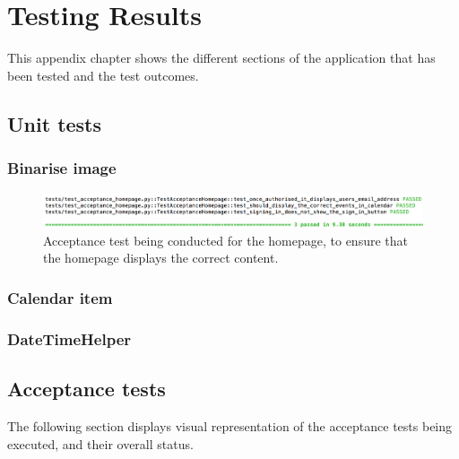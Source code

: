 \chapter{Testing Results}
\label{appendix:test_results}
This appendix chapter shows the different sections of the application that has been tested and the test outcomes.




\section{Unit tests}
\subsection{Binarise image}
\begin{figure}[H]
  \centering
  \includegraphics[width=\textwidth]{images/test_acceptance_homepage}
  \caption{Acceptance test being conducted for the homepage, to ensure that the homepage displays the correct content.}
  \label{fig:acceptance_homepage}
\end{figure}

\subsection{Calendar item}

\subsection{DateTimeHelper}


\section{Acceptance tests}
\label{appendix:acceptance}
The following section displays visual representation of the acceptance tests being executed, and their overall status.
